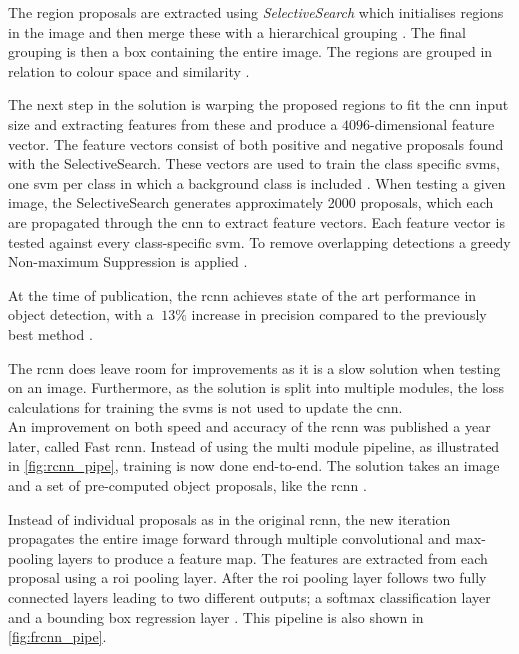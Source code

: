 The region proposals are extracted using \textit{SelectiveSearch} which initialises regions in the image and then merge these with a hierarchical grouping \citep{Uijlings2013}. The final grouping is then a box containing the entire image. The regions are grouped in relation to colour space and similarity \citep{Girshick2014}. 

The next step in the solution is warping the proposed regions to fit the \gls{cnn} input size and extracting features from these and produce a $4096$-dimensional feature vector. The feature vectors consist of both positive and negative proposals found with the SelectiveSearch. These vectors are used to train the class specific \gls{svm}s, one \gls{svm} per class in which a background class is included \citep{Girshick2014}.
When testing a given image, the SelectiveSearch generates approximately 2000 proposals, which each are propagated through the \gls{cnn} to extract feature vectors. Each feature vector is tested against every class-specific \gls{svm}. To remove overlapping detections a greedy Non-maximum Suppression is applied \citep{Girshick2014}.

At the time of publication, the \gls{rcnn} achieves state of the art performance in object detection, with a $~13\%$ increase in precision compared to the previously best method \citep{Girshick2014}.

The \gls{rcnn} does leave room for improvements as it is a slow solution when testing on an image. Furthermore, as the solution is split into multiple modules, the loss calculations for training the \gls{svm}s is not used to update the \gls{cnn}.\\

An improvement on both speed and accuracy of the \gls{rcnn} was published a year later, called Fast \gls{rcnn}. Instead of using the multi module pipeline, as illustrated in \autoref{fig:rcnn_pipe}, training is now done end-to-end. The solution takes an image  and a set of pre-computed object proposals, like the \gls{rcnn} \citep{Girshick2015}.

Instead of individual proposals as in the original \gls{rcnn}, the new iteration propagates the entire image forward through multiple convolutional and max-pooling layers to produce a feature map. The features are extracted from each proposal using a \gls{roi} pooling layer. After the \gls{roi} pooling layer follows two fully connected layers leading to two different outputs; a softmax classification layer and a bounding box regression layer \citep{Girshick2015}. This pipeline is also shown in \autoref{fig:frcnn_pipe}.

